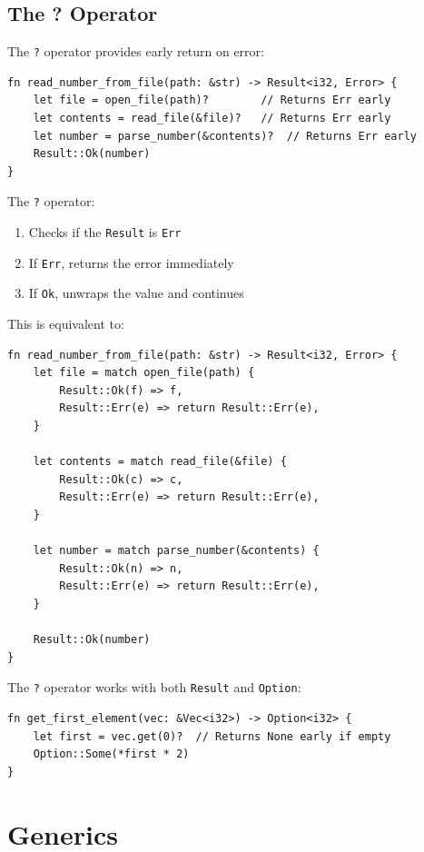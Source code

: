 \subsection{The ? Operator}

The \texttt{?} operator provides early return on error:

\begin{lstlisting}
fn read_number_from_file(path: &str) -> Result<i32, Error> {
    let file = open_file(path)?        // Returns Err early
    let contents = read_file(&file)?   // Returns Err early
    let number = parse_number(&contents)?  // Returns Err early
    Result::Ok(number)
}
\end{lstlisting}

The \texttt{?} operator:
\begin{enumerate}
\item Checks if the \texttt{Result} is \texttt{Err}
\item If \texttt{Err}, returns the error immediately
\item If \texttt{Ok}, unwraps the value and continues
\end{enumerate}

This is equivalent to:

\begin{lstlisting}
fn read_number_from_file(path: &str) -> Result<i32, Error> {
    let file = match open_file(path) {
        Result::Ok(f) => f,
        Result::Err(e) => return Result::Err(e),
    }

    let contents = match read_file(&file) {
        Result::Ok(c) => c,
        Result::Err(e) => return Result::Err(e),
    }

    let number = match parse_number(&contents) {
        Result::Ok(n) => n,
        Result::Err(e) => return Result::Err(e),
    }

    Result::Ok(number)
}
\end{lstlisting}

The \texttt{?} operator works with both \texttt{Result} and \texttt{Option}:

\begin{lstlisting}
fn get_first_element(vec: &Vec<i32>) -> Option<i32> {
    let first = vec.get(0)?  // Returns None early if empty
    Option::Some(*first * 2)
}
\end{lstlisting}

\section{Generics}

